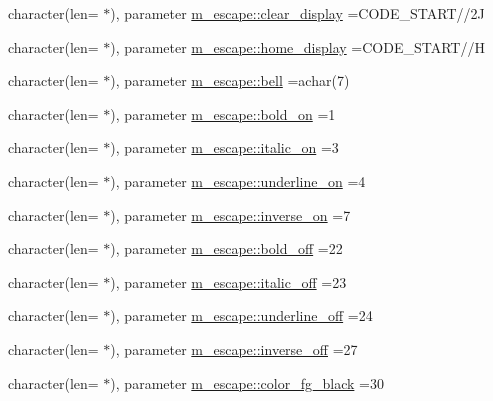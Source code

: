 \begin{DoxyCompactItemize}
character(len= $\ast$), parameter \mbox{\hyperlink{namespacem__escape_a9d45e30ea5891b89dc9a61ba1b5dbc03}{m\+\_\+escape\+::clear\+\_\+display}} =C\+O\+D\+E\+\_\+\+S\+T\+A\+RT//\textquotesingle{}2\+J\textquotesingle{}
\item 
character(len= $\ast$), parameter \mbox{\hyperlink{namespacem__escape_ae4634ac062742627f215df29998fc677}{m\+\_\+escape\+::home\+\_\+display}} =C\+O\+D\+E\+\_\+\+S\+T\+A\+RT//\textquotesingle{}H\textquotesingle{}
\item 
character(len= $\ast$), parameter \mbox{\hyperlink{namespacem__escape_a2cd9c30d3783af9d1f74a50e7f1dbd7f}{m\+\_\+escape\+::bell}} =achar(7)
\item 
character(len= $\ast$), parameter \mbox{\hyperlink{namespacem__escape_a8f30470c66af08cf881d9afe23357a03}{m\+\_\+escape\+::bold\+\_\+on}} =\textquotesingle{}1\textquotesingle{}
\item 
character(len= $\ast$), parameter \mbox{\hyperlink{namespacem__escape_a5bd07ea0cedbfd7d0e04b3b0be74821f}{m\+\_\+escape\+::italic\+\_\+on}} =\textquotesingle{}3\textquotesingle{}
\item 
character(len= $\ast$), parameter \mbox{\hyperlink{namespacem__escape_a6f4bcc5f8acb0683ed6d8e05c0100daa}{m\+\_\+escape\+::underline\+\_\+on}} =\textquotesingle{}4\textquotesingle{}
\item 
character(len= $\ast$), parameter \mbox{\hyperlink{namespacem__escape_afacdc9d33171b768ee026b1eb6726f8a}{m\+\_\+escape\+::inverse\+\_\+on}} =\textquotesingle{}7\textquotesingle{}
\item 
character(len= $\ast$), parameter \mbox{\hyperlink{namespacem__escape_a978fe9a5d07621c57c3163d8a7a62118}{m\+\_\+escape\+::bold\+\_\+off}} =\textquotesingle{}22\textquotesingle{}
\item 
character(len= $\ast$), parameter \mbox{\hyperlink{namespacem__escape_a93fc5a4e6f0ed044c9f6cf29412a05cb}{m\+\_\+escape\+::italic\+\_\+off}} =\textquotesingle{}23\textquotesingle{}
\item 
character(len= $\ast$), parameter \mbox{\hyperlink{namespacem__escape_a9e36a1a9bd4a64702ecef4a2e3d592b9}{m\+\_\+escape\+::underline\+\_\+off}} =\textquotesingle{}24\textquotesingle{}
\item 
character(len= $\ast$), parameter \mbox{\hyperlink{namespacem__escape_affae80c7d63858227a9f3134e6191f96}{m\+\_\+escape\+::inverse\+\_\+off}} =\textquotesingle{}27\textquotesingle{}
\item 
character(len= $\ast$), parameter \mbox{\hyperlink{namespacem__escape_a6c7b72b2cfc0a6ec7fc4080ad6750d99}{m\+\_\+escape\+::color\+\_\+fg\+\_\+black}} =\textquotesingle{}30\textquotesingle{}

\end{DoxyCompactItemize}
